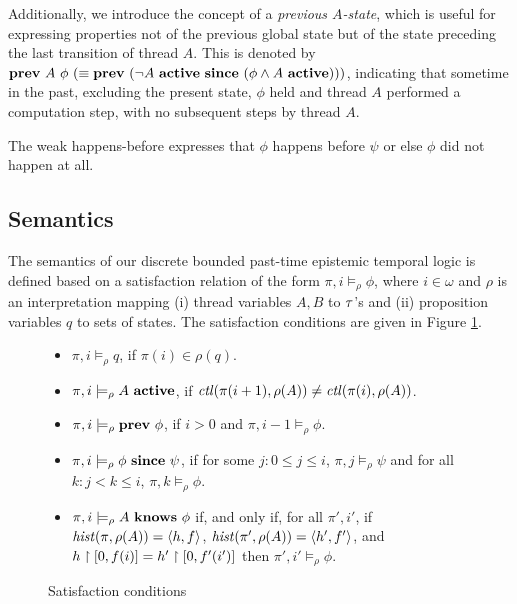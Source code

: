Additionally, we introduce the concept of a \textit{previous  $A$-state}, which is useful for expressing properties not of the previous global state but of the state preceding the last transition of thread  $A$. This is denoted by $\mathbf{prev}\ A\ \phi\ (\equiv \mathbf{prev}\ (\neg A\ \mathbf{active}\ \mathbf{since}\ (\phi \wedge A\ \mathbf{active})))$, indicating that sometime in the past, excluding the present state, 
$\phi$ held and thread $A$  performed a computation step, with no subsequent steps by thread $A$.

%
The weak happens-before expresses that $\phi$ happens before $\psi$ or else $\phi$ did not happen at all. 

\subsection{Semantics}
\label{sec:semantics}
The semantics of our discrete bounded past-time epistemic temporal logic is defined based on a satisfaction relation of the form $\pi,i\models_\rho \phi$, where $i\in\omega$ and $\rho$ is an interpretation mapping (i) thread variables $A,B$ to $\tau$'s and (ii) proposition variables $q$ to sets of states. The satisfaction conditions are given in Figure \ref{SatisfactionOneDef}. 

\begin{figure}[t]
\begin{itemize}
\item $\pi,i\models_{\rho}q$, if $\pi(i) \in \rho(q)$.
\item $\pi,i\models_\rho A\ \mathbf{active}$, if $\mathit{ctl}(\pi(i+1),\rho(A))\neq \mathit{ctl}(\pi(i),\rho(A))$.
\item $\pi,i\models_\rho \mathbf{prev}\ \phi$, if $i>0$ and $\pi,i-1\models_\rho \phi$.
\item $\pi,i\models_\rho \phi\ \Since\ \psi$, if for some $j:0\leq j\leq i$, $\pi,j\models_\rho \psi$ and for all $k:j < k\leq i$, $\pi,k\models_\rho \phi$.
\item $\pi,i\models_\rho A\ \Knows\ \phi$ if, and only if, for all $\pi',i'$, if $\mathit{hist}(\pi,\rho(A))=\langle h,f\rangle$,
$\mathit{hist}(\pi',\rho(A))=\langle h',f'\rangle$, and $ h\upharpoonright [0,f(i)] = h'\upharpoonright [0,f'(i')]$ then $\pi',i' \models_\rho \phi$.
\end{itemize}
\caption{Satisfaction conditions}
\label{SatisfactionOneDef}
\end{figure}


